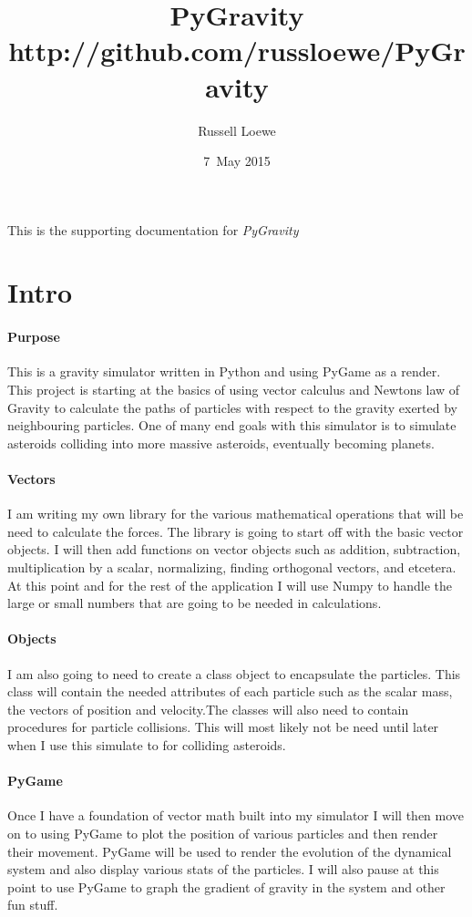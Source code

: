 \documentclass[15pt]{report}
\title{PyGravity \\
		\small http://github.com/russloewe/PyGravity}
\author{Russell Loewe}
\date{7~May 2015}
\begin{document}
\maketitle


\indent
This is the supporting documentation for
\textit{PyGravity} 


\section{Intro}
\indent \paragraph{Purpose} This is a gravity simulator written in Python and using PyGame as a render. This project is starting at the basics of using vector calculus and Newtons law of Gravity to calculate the paths of particles with respect to the gravity exerted by neighbouring particles. One of many end goals with this simulator is to simulate asteroids colliding into more massive asteroids, eventually becoming planets.
\indent \paragraph{Vectors}I am writing my own library for  the various mathematical operations that will be need to calculate the forces. The library is going to start off with the basic vector objects. I will then add functions on vector objects such as addition, subtraction, multiplication by a scalar, normalizing, finding orthogonal vectors, and etcetera. At this point and for the rest of the application I will use Numpy to handle the large or small numbers that are going to be needed in calculations.
\indent \paragraph{Objects} I am also going to need to create a class object to encapsulate the particles. This class will contain the needed attributes of each particle such as the scalar mass, the vectors of position and velocity.The classes will also need to contain procedures for particle collisions. This will most likely not be need until later when I use this simulate to for colliding asteroids.
\indent \paragraph{PyGame} Once I have a foundation of vector math built into my simulator I will then move on to using PyGame to plot the position of various particles and then render their movement. PyGame will be used to render the evolution of the dynamical system and also display various stats of the particles. I will also pause at this point to use PyGame to graph the gradient of gravity in the system and other fun stuff.
\end{document}
